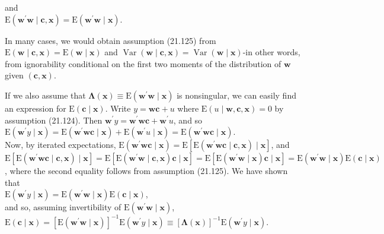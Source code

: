 \documentclass[10pt]{article}
\begin{document}
and\\
$\mathrm{E}\left(\mathbf{w}^{\prime} \mathbf{w} \mid \mathbf{c}, \mathbf{x}\right)=\mathrm{E}\left(\mathbf{w}^{\prime} \mathbf{w} \mid \mathbf{x}\right)$.

In many cases, we would obtain assumption (21.125) from $\mathrm{E}(\mathbf{w} \mid \mathbf{c}, \mathbf{x})=\mathrm{E}(\mathbf{w} \mid \mathbf{x})$ and $\operatorname{Var}(\mathbf{w} \mid \mathbf{c}, \mathbf{x})=\operatorname{Var}(\mathbf{w} \mid \mathbf{x})$-in other words, from ignorability conditional on the first two moments of the distribution of $\mathbf{w}$ given $(\mathbf{c}, \mathbf{x})$.

If we also assume that $\boldsymbol{\Lambda}(\mathbf{x}) \equiv \mathrm{E}\left(\mathbf{w}^{\prime} \mathbf{w} \mid \mathbf{x}\right)$ is nonsingular, we can easily find an expression for $\mathrm{E}(\mathbf{c} \mid \mathbf{x})$. Write $y=\mathbf{w c}+u$ where $\mathrm{E}(u \mid \mathbf{w}, \mathbf{c}, \mathbf{x})=0$ by assumption (21.124). Then $\mathbf{w}^{\prime} y=\mathbf{w}^{\prime} \mathbf{w c}+\mathbf{w}^{\prime} u$, and so\\
$\mathrm{E}\left(\mathbf{w}^{\prime} y \mid \mathbf{x}\right)=\mathrm{E}\left(\mathbf{w}^{\prime} \mathbf{w c} \mid \mathbf{x}\right)+\mathrm{E}\left(\mathbf{w}^{\prime} u \mid \mathbf{x}\right)=\mathrm{E}\left(\mathbf{w}^{\prime} \mathbf{w c} \mid \mathbf{x}\right)$.\\
Now, by iterated expectations, $\mathrm{E}\left(\mathbf{w}^{\prime} \mathbf{w c} \mid \mathbf{x}\right)=\mathrm{E}\left[\mathrm{E}\left(\mathbf{w}^{\prime} \mathbf{w c} \mid \mathbf{c}, \mathbf{x}\right) \mid \mathbf{x}\right]$, and\\
$\mathrm{E}\left[\mathrm{E}\left(\mathbf{w}^{\prime} \mathbf{w c} \mid \mathbf{c}, \mathbf{x}\right) \mid \mathbf{x}\right]=\mathrm{E}\left[\mathrm{E}\left(\mathbf{w}^{\prime} \mathbf{w} \mid \mathbf{c}, \mathbf{x}\right) \mathbf{c} \mid \mathbf{x}\right]=\mathrm{E}\left[\mathrm{E}\left(\mathbf{w}^{\prime} \mathbf{w} \mid \mathbf{x}\right) \mathbf{c} \mid \mathbf{x}\right]=\mathrm{E}\left(\mathbf{w}^{\prime} \mathbf{w} \mid \mathbf{x}\right) \mathrm{E}(\mathbf{c} \mid \mathbf{x})$, where the second equality follows from assumption (21.125). We have shown that\\
$\mathrm{E}\left(\mathbf{w}^{\prime} y \mid \mathbf{x}\right)=\mathrm{E}\left(\mathbf{w}^{\prime} \mathbf{w} \mid \mathbf{x}\right) \mathrm{E}(\mathbf{c} \mid \mathbf{x})$,\\
and so, assuming invertibility of $\mathrm{E}\left(\mathbf{w}^{\prime} \mathbf{w} \mid \mathbf{x}\right)$,\\
$\mathrm{E}(\mathbf{c} \mid \mathbf{x})=\left[\mathrm{E}\left(\mathbf{w}^{\prime} \mathbf{w} \mid \mathbf{x}\right)\right]^{-1} \mathrm{E}\left(\mathbf{w}^{\prime} y \mid \mathbf{x}\right) \equiv[\boldsymbol{\Lambda}(\mathbf{x})]^{-1} \mathrm{E}\left(\mathbf{w}^{\prime} y \mid \mathbf{x}\right)$.
\end{document}
